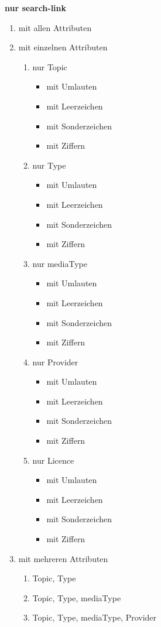 \pagebreak


\flushleft \textbf{nur search-link}

\begin{enumerate}
  \item mit allen Attributen
  \item mit einzelnen Attributen

   \begin{enumerate}
    \item nur Topic  
    \begin{itemize}
    \item mit Umlauten
    \item mit Leerzeichen
    \item mit Sonderzeichen
    \item mit Ziffern
\end{itemize}
	\item nur Type
 	\begin{itemize}
    \item mit Umlauten
    \item mit Leerzeichen
    \item mit Sonderzeichen
    \item mit Ziffern
\end{itemize}
	\item nur mediaType
	\begin{itemize}
    \item mit Umlauten
    \item mit Leerzeichen
    \item mit Sonderzeichen
    \item mit Ziffern
    \end{itemize}
    \item nur Provider
	\begin{itemize}
    \item mit Umlauten
    \item mit Leerzeichen
    \item mit Sonderzeichen
    \item mit Ziffern
    \end{itemize}
    \item nur Licence
	\begin{itemize}
    \item mit Umlauten
    \item mit Leerzeichen
    \item mit Sonderzeichen
    \item mit Ziffern
    \end{itemize}
\end{enumerate}
\item mit mehreren Attributen
\begin{enumerate}
    \item Topic, Type
	 \item Topic, Type, mediaType
	 \item Topic, Type, mediaType, Provider
\end{enumerate}
\end{enumerate}

